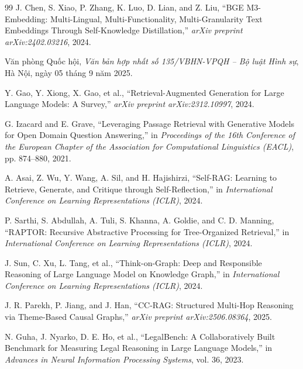 \begin{thebibliography}{99}
J. Chen, S. Xiao, P. Zhang, K. Luo, D. Lian, and Z. Liu,
``BGE M3-Embedding: Multi-Lingual, Multi-Functionality,
Multi-Granularity Text Embeddings Through Self-Knowledge Distillation,''
\textit{arXiv preprint arXiv:2402.03216}, 2024.

Văn phòng Quốc hội,
\textit{Văn bản hợp nhất số 135/VBHN-VPQH -- Bộ luật Hình sự},
Hà Nội, ngày 05 tháng 9 năm 2025.


Y. Gao, Y. Xiong, X. Gao, et al.,
``Retrieval-Augmented Generation for Large Language Models: A Survey,''
\textit{arXiv preprint arXiv:2312.10997}, 2024.

G. Izacard and E. Grave,
``Leveraging Passage Retrieval with Generative Models for Open Domain
Question Answering,''
in \textit{Proceedings of the 16th Conference of the European Chapter of the
Association for Computational Linguistics (EACL)},
pp. 874--880, 2021.

A. Asai, Z. Wu, Y. Wang, A. Sil, and H. Hajishirzi,
``Self-RAG: Learning to Retrieve, Generate, and Critique through
Self-Reflection,''
in \textit{International Conference on Learning Representations (ICLR)}, 2024.

P. Sarthi, S. Abdullah, A. Tuli, S. Khanna, A. Goldie, and C. D. Manning,
``RAPTOR: Recursive Abstractive Processing for Tree-Organized Retrieval,''
in \textit{International Conference on Learning Representations (ICLR)}, 2024.

J. Sun, C. Xu, L. Tang, et al.,
``Think-on-Graph: Deep and Responsible Reasoning of Large Language Model on
Knowledge Graph,''
in \textit{International Conference on Learning Representations (ICLR)}, 2024.

J. R. Parekh, P. Jiang, and J. Han,
``CC-RAG: Structured Multi-Hop Reasoning via Theme-Based Causal Graphs,''
\textit{arXiv preprint arXiv:2506.08364}, 2025.

N. Guha, J. Nyarko, D. E. Ho, et al.,
``LegalBench: A Collaboratively Built Benchmark for Measuring Legal Reasoning
in Large Language Models,''
in \textit{Advances in Neural Information Processing Systems},
vol. 36, 2023.


\end{thebibliography}
